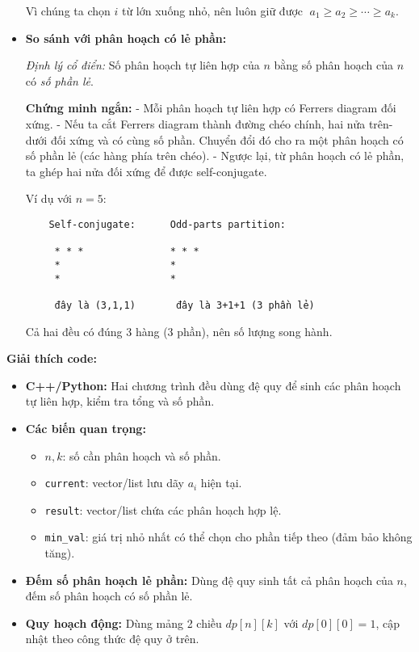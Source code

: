 \documentclass{article}
\begin{document}
\begin{itemize}
    Vì chúng ta chọn $i$ từ lớn xuống nhỏ, nên luôn giữ được $\;a_1\ge a_2\ge\cdots\ge a_k$.

    \item \textbf{So sánh với phân hoạch có lẻ phần:}

    \emph{Định lý cổ điển:} Số phân hoạch tự liên hợp của $n$ bằng số phân hoạch của $n$ có \emph{số phần lẻ}.  

    \textbf{Chứng minh ngắn:}  
    - Mỗi phân hoạch tự liên hợp có Ferrers diagram đối xứng.  
    - Nếu ta cắt Ferrers diagram thành đường chéo chính, hai nửa trên-dưới đối xứng và có cùng số phần. Chuyển đổi đó cho ra một phân hoạch có số phần lẻ (các hàng phía trên chéo).  
    - Ngược lại, từ phân hoạch có lẻ phần, ta ghép hai nửa đối xứng để được self-conjugate.  

    Ví dụ với $n=5$:
    \begin{verbatim}
    Self-conjugate:      Odd-parts partition:
    
     * * *               * * *
     *                   *
     *                   *
    
     đây là (3,1,1)       đây là 3+1+1 (3 phần lẻ)
    \end{verbatim}

    Cả hai đều có đúng 3 hàng (3 phần), nên số lượng song hành.
\end{itemize}

\textbf{Giải thích code:}

\begin{itemize}
    \item \textbf{C++/Python:} Hai chương trình đều dùng đệ quy để sinh các phân hoạch tự liên hợp, kiểm tra tổng và số phần.
    \item \textbf{Các biến quan trọng:}
    \begin{itemize}
        \item $n, k$: số cần phân hoạch và số phần.
        \item \texttt{current}: vector/list lưu dãy $a_i$ hiện tại.
        \item \texttt{result}: vector/list chứa các phân hoạch hợp lệ.
        \item \texttt{min\_val}: giá trị nhỏ nhất có thể chọn cho phần tiếp theo (đảm bảo không tăng).
    \end{itemize}
    \item \textbf{Đếm số phân hoạch lẻ phần:} Dùng đệ quy sinh tất cả phân hoạch của $n$, đếm số phân hoạch có số phần lẻ.
    \item \textbf{Quy hoạch động:} Dùng mảng 2 chiều $dp[n][k]$ với $dp[0][0]=1$, cập nhật theo công thức đệ quy ở trên.
\end{itemize}
\end{document}

